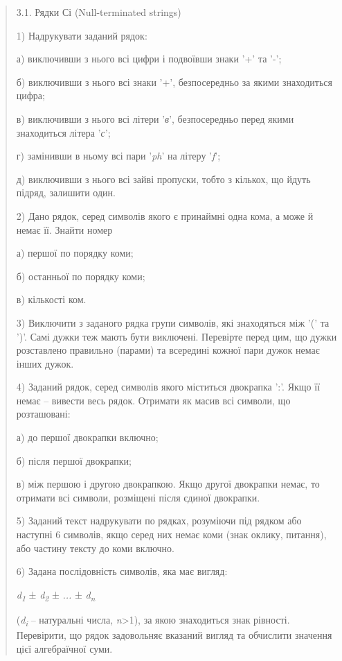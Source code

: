 \documentclass[]{article}
\begin{document}
\begin{quote}
\protect\hypertarget{_Hlk48903540}{}{}3.1. Рядки Сі (Null-terminated
strings)

1) Надрукувати заданий рядок:

а) виключивши з нього всі цифри і подвоївши знаки '+' та '-';

б) виключивши з нього всі знаки '+', безпосередньо за якими знаходиться
цифра;

в) виключивши з нього всі літери '\emph{в}', безпосередньо перед якими
знаходиться літера '\emph{с}';

г) замінивши в ньому всі пари '\emph{ph}' на літеру '\emph{f}';

д) виключивши з нього всі зайві пропуски, тобто з кількох, що йдуть
підряд, залишити один.

2) Дано рядок, серед символів якого є принаймні одна кома, а може й
немає її. Знайти номер

а) першої по порядку коми;

б) останньої по порядку коми;

в) кількості ком.

3) Виключити з заданого рядка групи символів, які знаходяться між '(' та
')'. Самі дужки теж мають бути виключені. Перевірте перед цим, що дужки
розставлено правильно (парами) та всередині кожної пари дужок немає
інших дужок.

4) Заданий рядок, серед символів якого міститься двокрапка ':'. Якщо її
немає -- вивести весь рядок. Отримати як масив всі символи, що
розташовані:

а) до першої двокрапки включно;

б) після першої двокрапки;

в) між першою і другою двокрапкою. Якщо другої двокрапки немає, то
отримати всі символи, розміщені після єдиної двокрапки.

5) Заданий текст надрукувати по рядках, розуміючи під рядком або
наступні 6 символів, якщо серед них немає коми (знак оклику, питання),
або частину тексту до коми включно.

6) Задана послідовність символів, яка має вигляд:

\emph{d\textsubscript{1}} ± \emph{d\textsubscript{2}} ± \emph{...} ±
\emph{d\textsubscript{n}}

(\emph{d\textsubscript{i }}-- натуральні числа,
\emph{n}\textgreater{}1), за якою знаходиться знак рівності. Перевірити,
що рядок задовольняє вказаний вигляд та обчислити значення цієї
алгебраїчної суми.
\end{quote}
\end{document}
